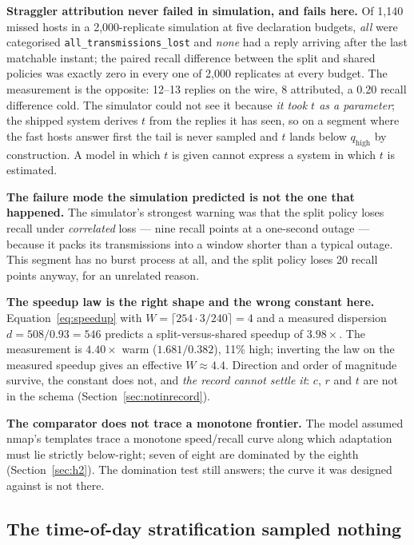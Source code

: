 \documentclass[conference]{IEEEtran}
\newcommand{\qhigh}{q_{\mathrm{high}}}
\begin{document}
\textbf{Straggler attribution never failed in simulation, and fails here.} Of
1{,}140 missed hosts in a 2{,}000-replicate simulation at five declaration
budgets, \emph{all} were categorised \texttt{all\_transmissions\_lost} and
\emph{none} had a reply arriving after the last matchable instant; the paired
recall difference between the split and shared policies was exactly zero in
every one of 2{,}000 replicates at every budget. The measurement is the
opposite: 12--13 replies on the wire, 8 attributed, a 0.20 recall difference
cold. The simulator could not see it because \emph{it took $t$ as a parameter};
the shipped system derives $t$ from the replies it has seen, so on a segment
where the fast hosts answer first the tail is never sampled and $t$ lands below
$\qhigh$ by construction. A model in which $t$ is given cannot express a system
in which $t$ is estimated.

\textbf{The failure mode the simulation predicted is not the one that
happened.} The simulator's strongest warning was that the split policy loses
recall under \emph{correlated} loss --- nine recall points at a one-second
outage --- because it packs its transmissions into a window shorter than a
typical outage. This segment has no burst process at all, and the split policy
loses 20 recall points anyway, for an unrelated reason.

\textbf{The speedup law is the right shape and the wrong constant here.}
Equation~\ref{eq:speedup} with $W=\lceil 254\cdot3/240\rceil=4$ and a measured
dispersion $d=508/0.93=546$ predicts a split-versus-shared speedup of
$3.98\times$. The measurement is $\mathbf{4.40\times}$ warm
($1.681/0.382$), 11\% high; inverting the law on the measured speedup gives an
effective $W\approx4.4$. Direction and order of magnitude survive, the constant
does not, and \emph{the record cannot settle it}: $c$, $r$ and $t$ are not in
the schema (Section~\ref{sec:notinrecord}).

\textbf{The comparator does not trace a monotone frontier.} The model assumed
nmap's templates trace a monotone speed/recall curve along which adaptation
must lie strictly below-right; seven of eight are dominated by the eighth
(Section~\ref{sec:h2}). The domination test still answers; the curve it was
designed against is not there.

\subsection{The time-of-day stratification sampled nothing}
\label{sec:strata}
\end{document}
